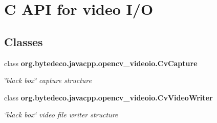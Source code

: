 \hypertarget{group__videoio__c}{}\section{C A\+PI for video I/O}
\label{group__videoio__c}
\subsection*{Classes}
\begin{DoxyCompactItemize}
\item 
class {\bfseries org.\+bytedeco.\+javacpp.\+opencv\+\_\+videoio.\+Cv\+Capture}
\begin{DoxyCompactList}\small\item\em \char`\"{}black box\char`\"{} capture structure \end{DoxyCompactList}\item 
class {\bfseries org.\+bytedeco.\+javacpp.\+opencv\+\_\+videoio.\+Cv\+Video\+Writer}
\begin{DoxyCompactList}\small\item\em \char`\"{}black box\char`\"{} video file writer structure \end{DoxyCompactList}\end{DoxyCompactItemize}
